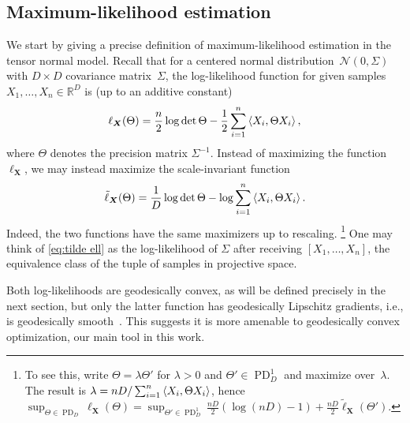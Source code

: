 \documentclass{article}
\newcommand{\R}{{\mathbb{R}}}
\renewcommand{\vec}{\bm}
\newcommand\cN{\mathcal{N}}
\newcommand\PD{\operatorname{PD}}
\begin{document}
\subsection{Maximum-likelihood estimation}
We start by giving a precise definition of maximum-likelihood estimation in the tensor normal model.
Recall that for a centered normal distribution~$\cN(0,\Sigma)$ with $D\times D$ covariance matrix~$\Sigma$, the log-likelihood function for given samples $X_1,\dots,X_n\in\R^D$ is (up to an additive constant)
\begin{align*}
  \ell_{\vec X}(\Theta)
  = \frac n2 \log \det \Theta - \frac12 \sum_{i=1}^n \braket{X_i, \Theta X_i},
\end{align*}
where $\Theta$ denotes the precision matrix $\Sigma^{-1}$.
Instead of maximizing the function~$\ell_{\vec X}$, we may instead maximize the scale-invariant function
\begin{align}\label{eq:tilde ell}
  \tilde\ell_{\vec X}(\Theta) = \frac1D\log\det \Theta - \log \sum_{i=1}^n \braket{X_i, \Theta X_i}.
\end{align}
Indeed, the two functions have the same maximizers up to rescaling.%
\footnote{To see this, write $\Theta = \lambda \Theta'$ for $\lambda>0$ and $\Theta'\in\PD_D^1$ and maximize over~$\lambda$.
The result is $\lambda = n D / \sum_{i=1}^n \braket{X_i, \Theta X_i}$, hence $\sup_{\Theta\in\PD_D} \ell_{\vec X}(\Theta) = \sup_{\Theta'\in\PD_D^1} \frac {nD}2 \left( \log(nD) - 1 \right) + \frac{nD}2 \tilde\ell_{\vec X}(\Theta')$.}
One may think of \cref{eq:tilde ell} as the log-likelihood of $\Sigma$ after receiving $[X_1, \dots, X_n]$, the equivalence class of the tuple of samples in projective space.

Both log-likelihoods are geodesically convex, as will be defined precisely in the next section, but only the latter function has geodesically Lipschitz gradients, i.e., is geodesically smooth~\cite{burgisser2019towards}.
This suggests it is more amenable to geodesically convex optimization, our main tool in this work.
\end{document}
